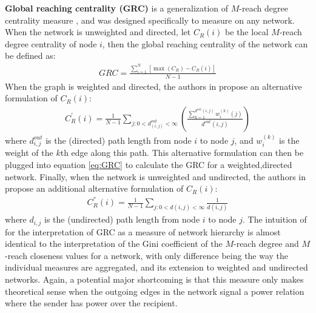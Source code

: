 \documentclass[3p,times]{elsarticle}
\begin{document}
\textbf{Global reaching centrality (GRC)}  is a generalization of $M$-reach degree centrality measure \cite{Mones2012}, and was designed specifically to measure on any network. When the network is unweighted and directed, let $C_R(i)$ be the local $M$-reach degree centrality of node $i$, then the global reaching centrality of the network can be defined as:
\begin{align}
	\label{eq:GRC}
	GRC=\frac{\sum_{i=1}^N{\left[\max(C_R)-C_R(i)\right]}}{N-1}
\end{align}
When the graph is weighted and directed, the authors in \cite{Mones2012} propose an alternative formulation of $C_R(i)$:
\begin{align}
	C_{R}^{'}(i)=\frac{1}{N-1}\sum_{j: 0<d^{out}_{(i,j)}<\infty}{( \frac{\sum_{k=1}^{d^{out}(i,j)} {w_{i}^{(k)} (j) } }{d^{out}(i,j)} )}
\end{align}
where $d^{out}_{i,j}$ is the (directed) path length from node $i$ to node $j$, and $w^{(k)}_{i}$ is the weight of the $k$th edge along this path. This alternative formulation can then be plugged into equation \ref{eq:GRC} to calculate the GRC for a weighted,directed network. Finally, when the network is unweighted and undirected, the authors in \cite{Mones2012} propose an additional alternative formulation of $C_R(i)$:
\begin{align}
	C_{R}^{''}(i)=\frac{1}{N-1}\sum_{j:0<d(i,j)<\infty}{\frac{1}{d(i,j)}}
\end{align}
where $d_{i,j}$ is the (undirected) path length from node $i$ to node $j$. The intuition of for the interpretation of GRC as a measure of network hierarchy is almost identical to the interpretation of the Gini coefficient of the $M$-reach degree and $M$-reach closeness values for a network, with only difference being the way the individual measures are aggregated, and its extension to weighted and undirected networks. Again, a potential major shortcoming is that this measure only makes theoretical sense when the outgoing edges in the network signal a power relation where the sender has power over the recipient. 
\end{document}
